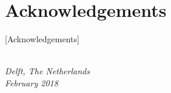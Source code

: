 \chapter*{Acknowledgements}

[Acknowledgements]

\begin{flushright}
{\makeatletter\itshape
    \@author \\
    Delft, The Netherlands \\
    February 2018
\makeatother}
\end{flushright}
